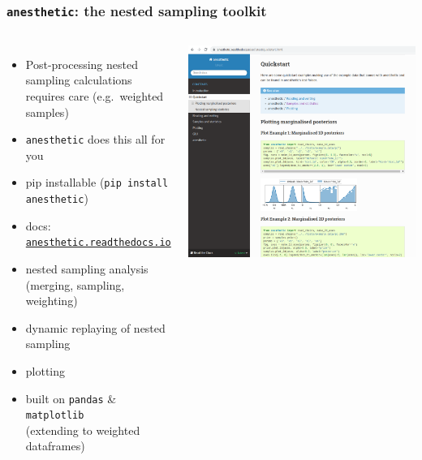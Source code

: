 \documentclass[aspectratio=169]{beamer}
\begin{document}
\begin{frame}
    \frametitle{\texttt{anesthetic}: the nested sampling toolkit}
    \begin{columns}
        \begin{itemize}
            \item Post-processing nested sampling calculations requires care (e.g.\ weighted samples)
            \item \texttt{anesthetic} does this all for you
            \item pip installable (\texttt{pip install anesthetic})
            \item docs: \href{https://anesthetic.readthedocs.io/en/latest/}{\texttt{anesthetic.readthedocs.io}}
            \item nested sampling analysis (merging, sampling, weighting)
            \item dynamic replaying of nested sampling
            \item plotting
            \item built on \texttt{pandas} \& \texttt{matplotlib}\\ (extending to weighted dataframes)
        \end{itemize}
        \centerline{\includegraphics[width=\textwidth]{figures/anesthetic_docs}}
    \end{columns}
\end{frame}
\end{document}
